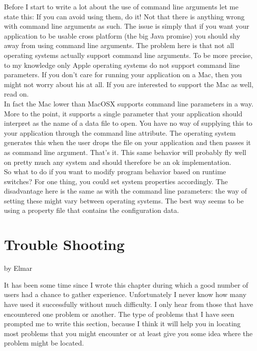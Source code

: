 Before I start to write a lot about the use of command line arguments
let me state this: If you can avoid using them, do it! Not that there
is anything wrong with command line arguments as such. The issue is
simply that if you want your application to be usable cross platform
(the big Java promise) you should shy away from using command line
arguments. The problem here is that not all operating systems actually
support command line arguments. To be more precise, to my knowledge only
Apple operating systems do not support command line parameters. If you
don't care for running your application on a Mac, then you might not
worry about his at all. If you are interested to support the Mac as
well, read on.\\

In fact the Mac lower than MacOSX supports command line parameters in a way.
More to the point, it supports a single parameter that your application should
interpret as the name of a data file to open. You have no way of
supplying this to your application through the command line attribute.
The operating system generates this when the user drops the file on your
application and then passes it as command line argument. That's it. This
same behavior will probably fly well on pretty much any system and
should therefore be an ok implementation.\\

So what to do if you want to modify program behavior based on runtime
switches? For one thing, you could set system properties accordingly.
The disadvantage here is the same as with the command line parameters: the
way of setting these might vary between operating systems. The best way
seems to be using a property file that contains the configuration
data.\\

\section{Trouble Shooting}

by Elmar

It has been some time since I wrote this chapter during which a good
number of users had a chance to gather experience. Unfortunately I
never know how many have used it successfully without much difficulty. I
only hear from those that have encountered one problem or another. The
type of problems that I have seen prompted me to write this section,
because I think it will help you in locating most problems that you might
encounter or at least give you some idea where the problem might be
located.\\

